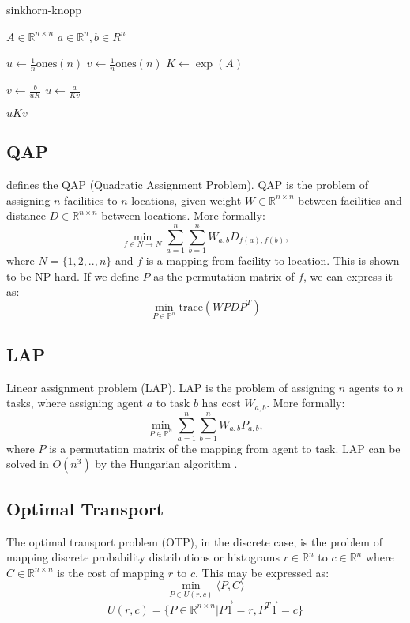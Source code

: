 \documentclass{article}
\begin{document}
\begin{algorithm}
\caption{sinkhorn-knopp}\label{alg:cap}
\begin{algorithmic}[1]
\Require $A \in \mathds{R}^{n \times n}$
\Require $a \in \mathds{R}^{n}, b \in R^{n}$

\State $u \gets \frac{1}{n}\text{ones}(n)$
\State $v \gets \frac{1}{n}\text{ones}(n)$
\State $K \gets \exp(A)$

    \State $v \gets \frac{b}{uK}$
    \State $u \gets \frac{a}{Kv}$
\EndFor

\State \Return $uKv$

\end{algorithmic}
\end{algorithm}

\subsection{QAP}
\citep{koopmans1957assignment} defines the QAP (Quadratic Assignment Problem). QAP is the problem of assigning $n$ facilities to $n$ locations, given weight $W \in \mathds{R}^{n \times n}$ between facilities and distance $D \in \mathds{R}^{n \times n}$ between locations. More formally:
$$ \min_{f \in N \rightarrow N} \sum_{a=1}^n \sum_{b=1}^n W_{a, b} D_{f(a), f(b)}, $$
where  $N = \{ 1, 2, .., n \}$ and $f$ is a mapping from facility to location. This is shown to be NP-hard. If we define $P$ as the permutation matrix of $f$, we can express it as:
$$ \min_{P \in \mathds{P}^n} \text{trace}(WPDP^T) $$

\subsection{LAP}
Linear assignment problem (LAP). LAP is the problem of assigning $n$ agents to $n$ tasks, where assigning agent $a$ to task $b$ has cost $W_{a,b}$. More formally:
$$ \min_{P \in \mathds{P}^n} \sum_{a=1}^n \sum_{b=1}^n W_{a, b} P_{a,b}, $$
where $P$ is a permutation matrix of the mapping from agent to task. LAP can be solved in $O(n^3)$ by the Hungarian algorithm \citep{kuhn1955hungarian}.

\subsection{Optimal Transport}
The optimal transport problem (OTP), in the discrete case, is the problem of mapping discrete probability distributions or histograms $r \in \mathds{R}^n$ to $c \in \mathds{R}^n$ where $C \in \mathds{R}^{n \times n}$ is the cost of mapping $r$ to $c$. This may be expressed as:
$$ \min_{P \in U(r, c)} \langle P, C \rangle $$
$$ U(r, c) = \{ P \in \mathds{R}^{n \times n} | P\vec{1} = r, P^T\vec{1} = c \} $$
\end{document}
